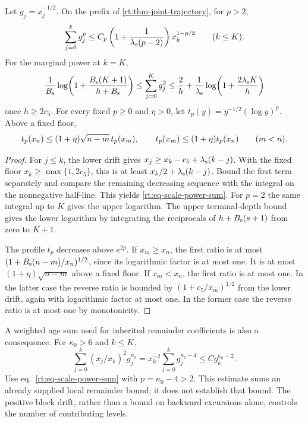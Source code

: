 \documentclass[11pt,letterpaper,reqno]{amsart}
\makeatletter
\numberwithin{equation}{section}
\renewcommand{\eqref}[1]{\textup{eq.~\ref{#1}}}
\theoremstyle{definition}
\newcommand{\ms@minorstart}{%
  \pushQED{\qed}\renewcommand{\qedsymbol}{$\blacksquare$}}
\newenvironment{lemma}[1][]{\ms@minorstart\ms@lemma[#1]}
  {\popQED\endms@lemma}
\theoremstyle{remark}
\makeatother
\begin{document}
\begin{lemma}[Sums of running powers]
\label{rt:lem-scale-sums}
Let \(g_j=x_j^{-1/2}\). On the prefix of
\cref{rt:thm-joint-trajectory}, for \(p>2\),
\begin{equation}\label{rt:eq-scale-power-sum}
 \sum_{j=0}^k g_j^p
 \le C_p\left(1+\frac1{\lambda_{\rm s}(p-2)}\right)
                              x_k^{1-p/2}\qquad(k\le K).
\end{equation}
For the marginal power at \(k=K\),
\[
 \frac1{B_{\rm s}}\log\!\left(1+\frac{B_{\rm s}(K+1)}
                                             {h+B_{\rm s}}\right)
 \le \sum_{j=0}^K g_j^2
 \le \frac2h+\frac1{\lambda_{\rm s}}
                 \log\!\left(1+\frac{2\lambda_{\rm s}K}{h}\right)
\]
once \(h\ge2c_5\). For every fixed \(p\ge0\) and \(\eta>0\),
let \(t_p(y)=y^{-1/2}(\log y)^p\). Above a fixed floor,
\[
  t_p(x_n)\le(1+\eta)\sqrt{n-m}\,t_p(x_m),\qquad
  t_p(x_m)\le(1+\eta)t_p(x_n)\qquad(m<n).\qedhere
\]
\end{lemma}
\begin{proof}
For \(j\le k\), the lower drift gives
\(x_j\ge x_k-c_5+\lambda_{\rm s}(k-j)\). With the fixed
floor \(x_k\ge\max\{1,2c_5\}\), this is at least
\(x_k/2+\lambda_{\rm s}(k-j)\). Bound the first term
separately and compare the remaining decreasing sequence with
the integral on the nonnegative half-line. This yields
\cref{rt:eq-scale-power-sum}. For \(p=2\) the same integral
up to \(K\) gives the upper logarithm. The upper terminal-depth
bound gives the lower logarithm by integrating the reciprocals
of \(h+B_{\rm s}(s+1)\) from zero to \(K+1\).

The profile \(t_p\) decreases above \(e^{2p}\). If \(x_m\ge
x_n\), the first ratio is at most
\((1+B_{\rm s}(n-m)/x_n)^{1/2}\), since its logarithmic factor
is at most one. It is at most \((1+\eta)\sqrt{n-m}\) above
a fixed floor. If \(x_m<x_n\), the first ratio is at most
one. In the latter case the reverse ratio is bounded by
\((1+c_5/x_m)^{1/2}\) from the lower drift, again with
logarithmic factor at most one. In the former case the reverse
ratio is at most one by monotonicity.
\end{proof}

A weighted age sum used for inherited remainder coefficients is
also a consequence. For $\kappa_0>6$ and $k\le K$,
\begin{equation}\label{rt:eq-inherited-remainder-sum}
 \sum_{j=0}^k(x_j/x_k)^2g_j^{\kappa_0}
  =x_k^{-2}\sum_{j=0}^k g_j^{\kappa_0-4}
  \le C g_k^{\kappa_0-2}.
\end{equation}
Use \eqref{rt:eq-scale-power-sum} with $p=\kappa_0-4>2$.
This estimate sums an already supplied local remainder bound;
it does not establish that bound. The positive block drift,
rather than a bound on backward excursions alone, controls the
number of contributing levels.
\end{document}
